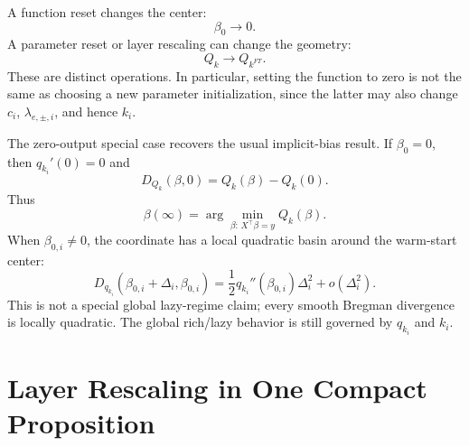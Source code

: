\documentclass[11pt]{article}
\begin{document}
A function reset changes the center:
\begin{equation}
    \beta_0\to 0.
\end{equation}
A parameter reset or layer rescaling can change the geometry:
\begin{equation}
    Q_k\to Q_{k^{FT}}.
\end{equation}
These are distinct operations. In particular, setting the function to zero is not the same as choosing a new parameter initialization, since the latter may also change \(c_i\), \(\lambda_{e,\pm,i}\), and hence \(k_i\).

The zero-output special case recovers the usual implicit-bias result. If \(\beta_0=0\), then \(q_{k_i}'(0)=0\) and
\begin{equation}
    D_{Q_k}(\beta,0)=Q_k(\beta)-Q_k(0).
\end{equation}
Thus
\begin{equation}
    \beta(\infty)
    =
    \arg\min_{\beta:\,X^\top\beta=y}Q_k(\beta).
\end{equation}
When \(\beta_{0,i}\neq0\), the coordinate has a local quadratic basin around the warm-start center:
\begin{equation}
    D_{q_{k_i}}(\beta_{0,i}+\Delta_i,\beta_{0,i})
    =
    \frac12q_{k_i}''(\beta_{0,i})\Delta_i^2+o(\Delta_i^2).
\end{equation}
This is not a special global lazy-regime claim; every smooth Bregman divergence is locally quadratic. The global rich/lazy behavior is still governed by \(q_{k_i}\) and \(k_i\).

\section{Layer Rescaling in One Compact Proposition}
\end{document}
